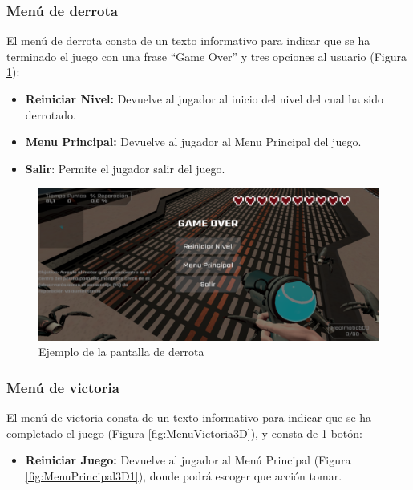 \subsubsection{Menú de derrota}
El menú de derrota consta de un texto informativo para indicar que se ha terminado el juego con una frase ``Game Over'' y tres opciones al usuario (Figura \ref{fig:MenuDerrota}):
\begin{itemize}
	\item \textbf{Reiniciar Nivel:} Devuelve al jugador al inicio del nivel del cual ha sido derrotado.
	\item \textbf{Menu Principal:} Devuelve al jugador al Menu Principal del juego.
	\item \textbf{Salir}: Permite el jugador salir del juego.
\end{itemize}

\begin{figure}[H]
	\centering
	\includegraphics[scale=0.40]{imagenes/MenuDerrota.png}
	\caption{\label{fig:MenuDerrota}Ejemplo de la pantalla de derrota}
\end{figure}

\subsubsection{Menú de victoria}
El menú de victoria consta de un texto informativo para indicar que se ha completado el juego (Figura \ref{fig:MenuVictoria3D}), y consta de 1 botón:
\begin{itemize}
	\item \textbf{Reiniciar Juego:} Devuelve al jugador al Menú Principal (Figura \ref{fig:MenuPrincipal3D1}), donde podrá escoger que acción tomar.
\end{itemize}

